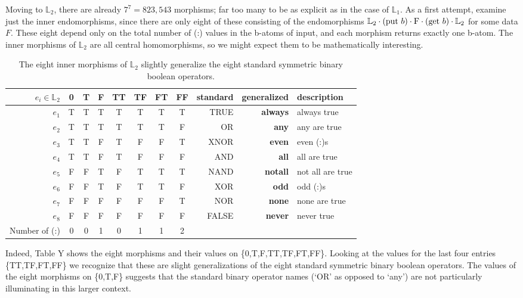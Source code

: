 \documentclass[11pt]{article}
\begin{document}
    Moving to ${\mathbb L}_2$, there are already $7^7=823,543$ morphisms; far too many to be as explicit as in the case of ${\mathbb L}_1$.  
 As a first attempt, examine just the inner endomorphisms, since there are only eight of these consisting of 
 the endomorphisms ${\mathbb L}_2\cdot ({\rm put}\ b)\cdot {\rm F} \cdot ({\rm get}\ b) \cdot {\mathbb L}_2$
for some data $F$.  These eight depend only on the total number of (:) values in the b-atoms of input, and each morphism returns exactly one b-atom.  
The inner morphisms of ${\mathbb L}_2$ are all central homomorphisms, so we might expect them to be
mathematically interesting.   
\begin{table}
\caption{The eight inner morphisms of ${\mathbb L}_2$ slightly generalize the eight standard symmetric binary boolean operators.}
\centering 
\begin{tabular}{r c c c c c c c r r l}
\hline\hline
$e_i \in {\mathbb L}_2$ & 0 & T & F & TT & TF & FT & FF & standard & generalized & description \\ [0.5ex] 
\hline
$e_1$  & T & T & T & T & T & T & T & TRUE & {\bf always} & always true \\
$e_2$  & T & T & T & T & T & T & F & OR & {\bf any} & any are true \\
$e_3$  & T & T & F & T & F & F & T & XNOR & {\bf even} & even (:)s \\
$e_4$ & T & T & F & T & F & F & F & AND & {\bf all} & all are true \\
$e_5$ & F & F & T & F & T & T & T & NAND & {\bf notall} & not all are true \\
$e_6$ & F & F & T & F & T & T & F & XOR & {\bf odd} & odd (:)s \\
$e_7$ & F & F & F & F & F & F & T & NOR & {\bf none} & none are true  \\
$e_8$ & F & F & F & F & F & F & F & FALSE & {\bf never} & never true \\
\hline
Number of (:)   & 0 & 0 & 1 & 0 & 1 & 1 & 2 &  \\ 
\hline
\end{tabular}
\label{table:L2}
\end{table} 
Indeed, Table Y shows the eight morphisms and their values on \{0,T,F,TT,TF,FT,FF\}.  Looking at the values for the last four entries \{TT,TF,FT,FF\} 
we recognize that these are slight generalizations of the eight standard symmetric binary boolean operators.  The values of the eight morphisms 
on \{0,T,F\} suggests that the standard binary operator names (`OR' as opposed to `any') are not particularly illuminating in this larger context.  
\end{document}
